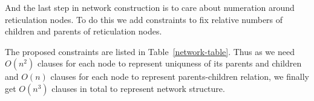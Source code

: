 \documentclass[runningheads, envcountsame, a4paper]{llncs}
\begin{document}
And the last step in network construction is to care about numeration around reticulation nodes. To do this we add constraints to fix 
relative numbers of children and parents of reticulation nodes. 

The proposed constraints are listed in Table~\ref{network-table}. Thus as we need $O(n^2)$ clauses for each node to represent uniquness of 
its parents and children and $O(n)$ clauses for each node to represent parents-children relation, we finally get $O(n^3)$ clauses in total 
to represent network structure.

\begin{table}
\centering
\caption{Clauses for network structure encoding}
\end{table}
\end{document}
